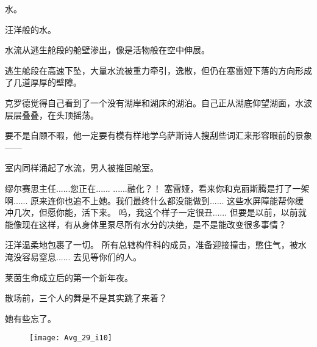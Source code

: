 \documentclass[openany]{book}
\begin{document}
水。\par
汪洋般的水。\par
水流从逃生舱段的舱壁渗出，像是活物般在空中伸展。\par
逃生舱段在高速下坠，大量水流被重力牵引，逸散，但仍在塞雷娅下落的方向形成了几道厚厚的壁障。\par
克罗德觉得自己看到了一个没有湖岸和湖床的湖泊。自己正从湖底仰望湖面，水波层层叠叠，在头顶摇荡。\par
要不是自顾不暇，他一定要有模有样地学乌萨斯诗人搜刮些词汇来形容眼前的景象——\par
室内同样涌起了水流，男人被推回舱室。

\begin{dialogue}
     缪尔赛思主任......您正在......
     ......融化？！
     塞雷娅，看来你和克丽斯腾是打了一架啊......
     原来连你也追不上她。我们最终什么都没能做到......
     这些水屏障能帮你缓冲几次，但愿你能，活下来。
     呜，我这个样子一定很丑......
     但要是以前，以前就能像现在这样，有从身体里泵尽所有水分的决绝，是不是能改变很多事情？\par
    汪洋温柔地包裹了一切。
     所有总辖构件科的成员，准备迎接撞击，憋住气，被水淹没容易窒息......
     去见等你们的人。\par
    莱茵生命成立后的第一个新年夜。\par
    散场前，三个人的舞是不是其实跳了来着？\par
    她有些忘了。
\end{dialogue}
\begin{figure}[h]
    \centering
    \texttt{[image: Avg\_29\_i10]}
\end{figure}
\end{document}
